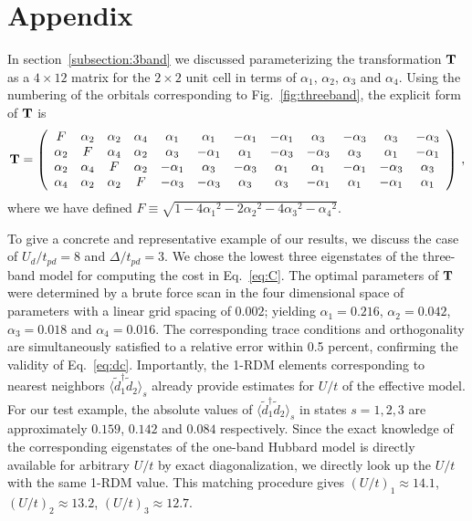 \section*{Appendix}
In section~\ref{subsection:3band} we discussed parameterizing the transformation ${\bf T}$ 
as a $4\times12$ matrix for the $2 \times 2$ unit cell in terms of $\alpha_1$, $\alpha_2$, $\alpha_3$ 
and $\alpha_4$. Using the numbering of the orbitals corresponding to Fig.~\ref{fig:threeband}, 
the explicit form of ${\bf T}$ is
\begin{eqnarray}
{\bf T} = 
\left(
\begin{array}{cccccccccccc}
F        & \alpha_2 &        \alpha_2 &  \alpha_4 & \alpha_1 & \alpha_1 & -\alpha_1 & -\alpha_1 & \alpha_3 & -\alpha_3 & \alpha_3 & -\alpha_3 \\
\alpha_2 &  F       &        \alpha_4 &  \alpha_2 & \alpha_3 & -\alpha_1 & \alpha_1 & -\alpha_3 & -\alpha_3 & \alpha_3 & \alpha_1 & -\alpha_1 \\
\alpha_2 & \alpha_4 & F               &  \alpha_2 & -\alpha_1 & \alpha_3 & -\alpha_3 & \alpha_1 & \alpha_1 & -\alpha_1 & -\alpha_3 & \alpha_3 \\
\alpha_4 & \alpha_2 & \alpha_2        &   F       & -\alpha_3 & -\alpha_3 & \alpha_3 & \alpha_3 & -\alpha_1 & \alpha_1 & -\alpha_1 & \alpha_1 \\
\end{array}
\right)\,,
\end{eqnarray}
where we have defined $F \equiv \sqrt{1-4{\alpha_1}^2 - 2{\alpha_2}^2 - 4 {\alpha_3}^2 -{\alpha_4}^2}$.

To give a concrete and representative example of our results, we discuss the case of 
$U_d/t_{pd}=8$ and $\Delta/t_{pd}=3$. We chose the lowest three eigenstates 
of the three-band model for computing the cost in Eq.~\eqref{eq:C}. The optimal parameters of ${\bf T}$ were determined by a brute force scan 
in the four dimensional space of parameters with a linear grid spacing of $0.002$; yielding $\alpha_1=0.216$, $\alpha_2=0.042$, $\alpha_3=0.018$ and $\alpha_4=0.016$. 
The corresponding trace conditions and orthogonality are simultaneously 
satisfied to a relative error within 0.5 percent, confirming the validity of Eq.~\eqref{eq:dc}. 
Importantly, the 1-RDM elements corresponding to nearest neighbors $\langle \tilde{d}_1^{\dagger} \tilde{d}_2 \rangle_s$ 
already provide estimates for $U/t$ of the effective model. 
For our test example, the absolute values of $\langle \tilde{d}_1^{\dagger} \tilde{d}_2 \rangle_s$ 
in states $s=1,2,3$ are approximately $0.159$, $0.142$ and $0.084$ respectively. 
Since the exact knowledge of the corresponding eigenstates of the one-band Hubbard model is directly available for arbitrary 
$U/t$ by exact diagonalization, we directly look up the $U/t$ with 
the same 1-RDM value. This matching procedure gives $(U/t)_1 \approx 14.1 $, $(U/t)_2 \approx 13.2 $, $(U/t)_3 \approx 12.7 $. 
 
